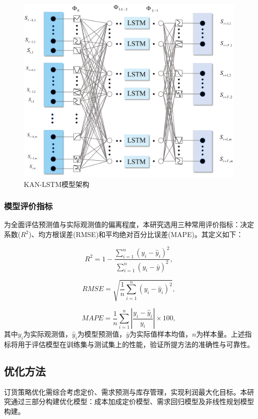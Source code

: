 \documentclass[lang=cn,12pt,a4paper]{elegantpaper}
\begin{document}
\begin{figure}[H]
        \centering
        \includegraphics[width=1\textwidth]{图片3.png}
        \caption{KAN-LSTM模型架构}
        \label{fig:fig3}
\end{figure}

\subsubsection{模型评价指标}
\label{subsubsec:model_evaluation_metrics}
为全面评估预测值与实际观测值的偏离程度，本研究选用三种常用评价指标：决定系数($R^2$)、均方根误差(RMSE)和平均绝对百分比误差(MAPE)。其定义如下：

\begin{equation}
R^2 = 1 - \frac{\sum_{i=1}^{n} (y_i - \hat{y}_i)^2}{\sum_{i=1}^{n} (y_i - \bar{y})^2},
\end{equation}

\begin{equation}
RMSE = \sqrt{\frac{1}{n} \sum_{i=1}^{n} (y_i - \hat{y}_i)^2},
\end{equation}

\begin{equation}
MAPE = \frac{1}{n} \sum_{i=1}^{n} \left| \frac{y_i - \hat{y}_i}{y_i} \right| \times 100,
\end{equation}
其中$y_i$为实际观测值，$\hat{y}_i$为模型预测值，$\bar{y}$为实际值样本均值，$n$为样本量。上述指标将用于评估模型在训练集与测试集上的性能，验证所提方法的准确性与可靠性。
\subsection{优化方法}
\label{subsec:optimization_method}
订货策略优化需综合考虑定价、需求预测与库存管理，实现利润最大化目标。本研究通过三部分构建优化模型：成本加成定价模型、需求回归模型及非线性规划模型构建。
\end{document}
